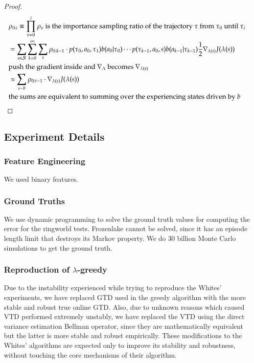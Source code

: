 \begin{proof}
\begin{equation}
\begin{aligned}
& \text{$\rho_{0:i} \equiv \prod_{v=0}^{i}{\rho_{v}}$ is the importance sampling ratio of the trajectory $\tau$ from $\tau_0$ until $\tau_i$}\\
& = \sum_{s \in \mathcal{S}}{\sum_{k=0}^{\infty}{\sum_{\tau}{\rho_{0:k-1} \cdot p(\tau_0, a_0, \tau_1)  b(a_0|\tau_0) \cdots p(\tau_{k-1}, a_0, s) b(a_{k-1}|\tau_{k-1}) \frac{1}{2} \nabla_{\lambda(s)} J(\lambda(s))}}}\\
& \text{push the gradient inside and $\nabla_{\Lambda}$ becomes $\nabla_{\lambda(s)}$}\\
& \approx \sum_{s \sim b}{\rho_{0:t-1} \cdot \nabla_{\lambda(s)} J(\lambda(s))}\\
& \text{the sums are equivalent to summing over the experiencing states driven by $b$}
\end{aligned}\nonumber
\end{equation}
\end{proof}
\subsection{Experiment Details}
\subsubsection{Feature Engineering}
We used binary features.
\subsubsection{Ground Truths}
We use dynamic programming to solve the ground truth values for computing the error for the ringworld tests. Frozenlake cannot be solved, since it has an episode length limit that destroys its Markov property. We do $30$ billion Monte Carlo simulations to get the ground truth.
\subsubsection{Reproduction of $\lambda$-greedy}
Due to the instability experienced while trying to reproduce the Whites' experiments, we have replaced GTD used in the greedy algorithm with the more stable and robust true online GTD. Also, due to unknown reasons which caused VTD performed extremely unstably, we have replaced the VTD using the direct variance estimation Bellman operator, since they are mathematically equivalent but the latter is more stable and robust empirically. These modifications to the Whites' algorithms are expected only to improve its stability and robustness, without touching the core mechanisms of their algorithm.
